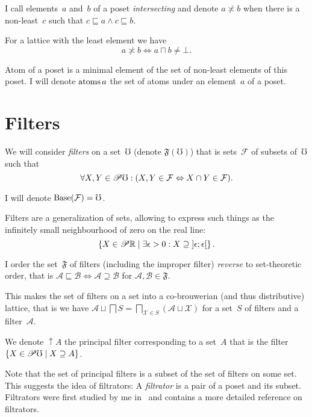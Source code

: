 \documentclass{amsart}
\begin{document}
I call elements~$a$ and~$b$ of a poset \emph{intersecting} and
denote $a\nasymp b$ when there is a non-least~$c$ such that $c\sqsubseteq a\land c\sqsubseteq b$.

For a lattice with the least element we have
\[ a\nasymp b \Leftrightarrow a\sqcap b\ne\bot. \]

Atom of a poset is a minimal element of the set of non-least elements of this poset.
I will denote $\operatorname{atoms} a$ the set of atoms under an element~$a$ of a poset.

\section{Filters}

We will consider \emph{filters} on a set~$\mho$ (denote $\mathfrak{F}(\mho)$) that is sets~$\mathcal{F}$ of subsets of~$\mho$ such that
\[ \forall X,Y\in\mathscr{P}\mho:
(X,Y\in\mathcal{F} \Leftrightarrow X\cap Y\in\mathcal{F}). \]

I will denote $\operatorname{Base}(\mathcal{F})=\mho$.

Filters are a generalization of sets, allowing to express such things as the infinitely small neighbourhood of zero on the real line: \[ \left\{ X\in\mathscr{P}\mathbb{R} \mid \exists\epsilon>0:X\supseteq\left]\epsilon;\epsilon\right[ \right\}. \]

\begin{defn}
I order the set~$\mathfrak{F}$ of filters (including the improper filter) \emph{reverse} to set-theoretic order, that is
$\mathcal{A} \sqsubseteq \mathcal{B} \Leftrightarrow \mathcal{A} \supseteq \mathcal{B}$
for $\mathcal{A},\mathcal{B}\in\mathfrak{F}$.
\end{defn}

\begin{prop}
This makes the set of filters on a set into a co-brouwerian (and thus distributive) lattice, that is we have
$\mathcal{A} \sqcup \bigsqcap S = \bigsqcap_{\mathcal{X}\in S} (\mathcal{A} \sqcup \mathcal{X})$
for a set~$S$ of filters and a filter~$\mathcal{A}$.
\end{prop}

We denote $\uparrow A$ the principal filter corresponding to a set~$A$ that is the filter $\left\{ X\in\mathscr{P}\mho \mid X\supseteq A \right\}$.

Note that the set of principal filters is a subset of the set of filters on some set. This suggests the idea of filtrators: A \emph{filtrator} is a pair of a poset and its subset. Filtrators were first studied by me in~\cite{filters} and \cite{volume-1-edition1} contains a more detailed reference on filtrators.
\end{document}
